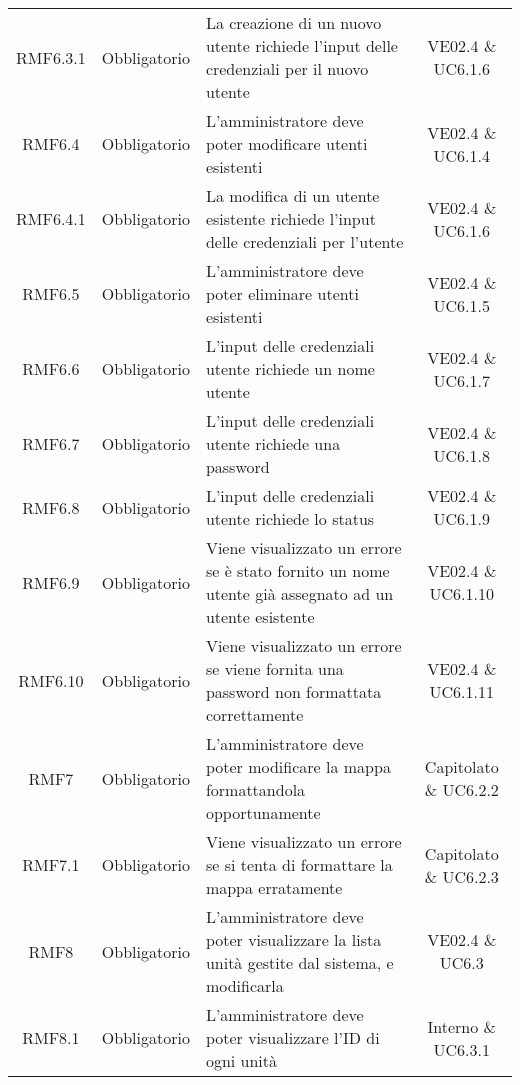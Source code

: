 \begin{longtable}[h!] { c c m{8cm} c}
		RMF6.3.1 & Obbligatorio & La creazione di un nuovo utente richiede l'input delle credenziali per il nuovo utente & VE02.4 \& UC6.1.6 \\
		
		RMF6.4 & Obbligatorio & L'amministratore deve poter modificare utenti esistenti & VE02.4 \& UC6.1.4 \\
		
		RMF6.4.1 & Obbligatorio & La modifica di un utente esistente richiede l'input delle credenziali per l'utente & VE02.4 \& UC6.1.6 \\
		
		RMF6.5 & Obbligatorio & L'amministratore deve poter eliminare utenti esistenti & VE02.4 \& UC6.1.5 \\
		
		RMF6.6 & Obbligatorio & L'input delle credenziali utente richiede un nome utente & VE02.4 \& UC6.1.7 \\
		
		RMF6.7 & Obbligatorio & L'input delle credenziali utente richiede una password & VE02.4 \& UC6.1.8 \\
		
		RMF6.8 & Obbligatorio & L'input delle credenziali utente richiede lo status & VE02.4 \& UC6.1.9 \\
		
		RMF6.9 & Obbligatorio & Viene visualizzato un errore se è stato fornito un nome utente già assegnato ad un utente esistente & VE02.4 \& UC6.1.10 \\
		
		RMF6.10 & Obbligatorio & Viene visualizzato un errore se viene fornita una password non formattata correttamente & VE02.4 \& UC6.1.11 \\
		
		RMF7 & Obbligatorio & L'amministratore deve poter modificare la mappa formattandola opportunamente & Capitolato \& UC6.2.2 \\
		
		RMF7.1 & Obbligatorio & Viene visualizzato un errore se si tenta di formattare la mappa erratamente & Capitolato \& UC6.2.3 \\
		
		RMF8 & Obbligatorio & L'amministratore deve poter visualizzare la lista unità gestite dal sistema, e modificarla & VE02.4 \& UC6.3 \\
		
		RMF8.1 & Obbligatorio & L'amministratore deve poter visualizzare l'ID di ogni unità & Interno \& UC6.3.1 \\
		

\end{longtable}
